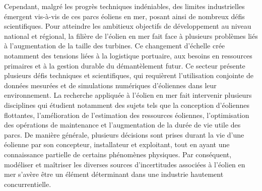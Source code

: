 Cependant, malgr\'{e} les progrès techniques ind\'{e}niables, des limites industrielles \'{e}mergent vis-à-vis de ces parcs \'{e}oliens en mer, posant ainsi de nombreux d\'{e}fis scientifiques. 
Pour atteindre les ambitieux objectifs de d\'{e}veloppement au niveau national et r\'{e}gional, la filière de l'\'{e}olien en mer fait face à plusieurs problèmes li\'{e}s à l'augmentation de la taille des turbines.
Ce changement d'\'{e}chelle cr\'{e}e notamment des tensions li\'{e}es à la logistique portuaire, aux besoins en ressources primaires et à la gestion durable du d\'{e}mantèlement futur. 
Ce secteur pr\'{e}sente plusieurs d\'{e}fis techniques et scientifiques, qui requièrent l'utilisation conjointe de donn\'{e}es mesur\'{e}es et de simulations num\'{e}riques d'\'{e}oliennes dans leur environnement. 
La recherche appliqu\'{e}e à l'\'{e}olien en mer fait intervenir plusieurs disciplines qui \'{e}tudient notamment des sujets tels que la conception d'\'{e}oliennes flottantes, l'am\'{e}lioration de l'estimation des ressources \'{e}oliennes, l'optimisation des op\'{e}rations de maintenance et l'augmentation de la dur\'{e}e de vie utile des parcs. 
De manière g\'{e}n\'{e}rale, plusieurs d\'{e}cisions sont prises durant la vie d'une \'{e}olienne par son concepteur, installateur et exploitant, tout en ayant une connaissance partielle de certains ph\'{e}nomènes physiques. 
Par cons\'{e}quent, mod\'{e}liser et maîtriser les diverses sources d'incertitudes associ\'{e}es à l'\'{e}olien en mer s'avère être un \'{e}l\'{e}ment d\'{e}terminant dans une industrie hautement concurrentielle.

